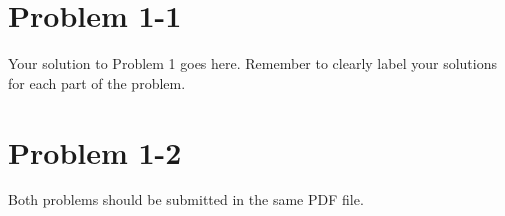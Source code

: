 \documentclass{pset}
\author{Dustin Doss}
\begin{document}
\section*{Problem 1-1}
Your solution to Problem 1 goes here. Remember to clearly label your solutions for each part of the problem. 

\section*{Problem 1-2}
Both problems should be submitted in the same PDF file.
\end{document}
